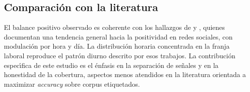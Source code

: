 \subsection{Comparaci\'on con la literatura}

El balance positivo observado es coherente con los hallazgos de
\citet{golder2011diurnal} y \citet{bollen2011twitter}, quienes documentan una tendencia
general hacia la positividad en redes sociales, con modulaci\'on por hora y día. La
distribuci\'on horaria concentrada en la franja laboral reproduce el patr\'on diurno
descrito por esos trabajos. La contribuci\'on espec\'\i{}fica de este estudio es el
\'enfasis en la separaci\'on de se\~nales y en la honestidad de la cobertura, aspectos
menos atendidos en la literatura orientada a maximizar \emph{accuracy} sobre corpus
etiquetados.
